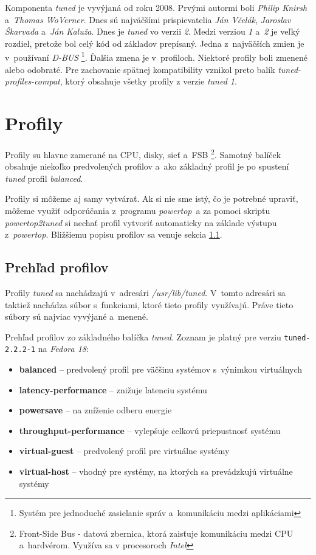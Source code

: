 Komponenta \emph{tuned} je vyvýjaná od roku 2008. Prvými autormi boli
\emph{Philip Knirsh} a~\emph{Thomas WoVerner}. Dnes sú najväčšími
prispievatelia \emph{Ján Včelák}, \emph{Jaroslav Škarvada} a~\emph{Ján Kaluža}.
Dnes je \emph{tuned} vo verzii \emph{2}. Medzi verziou \emph{1} a~\emph{2} je
veľký rozdiel, pretože bol celý kód od základov prepísaný. Jedna z~najväčších
zmien je v~používaní \emph{D-BUS} \footnote{Systém pre jednoduché zasielanie
správ a~komunikáciu medzi aplikáciami}. Ďalšia zmena je v~profiloch. Niektoré
profily boli zmenené alebo odobraté. Pre zachovanie spätnej kompatibility
vznikol preto balík \emph{tuned-profiles-compat}, ktorý obsahuje všetky profily
z verzie \emph{tuned 1}.

%
%

\section{Profily}

Profily su hlavne zamerané na CPU, disky, sieť a~FSB \footnote{Front-Side Bus -
datová zbernica, ktorá zaisťuje komunikáciu medzi CPU a~hardvérom. Využíva sa v
procesoroch \emph{Intel}}. Samotný balíček obsahuje niekoľko predvolených
profilov a~ako základný profil je po spustení \emph{tuned} profil \emph{balanced}.

Profily si môžeme aj samy vytvárať. Ak si nie sme istý, čo je potrebné upraviť,
môžeme využiť odporúčania z~programu \emph{powertop}\cite{powertopHomepage}~a
za pomoci skriptu \emph{powertop2tuned} si nechať profil vytvoriť automaticky
na základe výstupu z~\emph{powertop}. Bližšiemu popisu profilov sa venuje
sekcia \ref{sec:prehladProfilov}. 


%
%

\subsection{Prehľad profilov}
\label{sec:prehladProfilov}

Profily \emph{tuned} sa nachádzajú v~adresári \emph{/usr/lib/tuned}. V~tomto
adresári sa taktiež nachádza súbor s~funkciami, ktoré tieto profily využívajú.
Práve tieto súbory sú najviac vyvýjané a~menené.

Prehľad profilov zo základného balíčka \emph{tuned}. Zoznam je platný pre
verziu \texttt{tuned-2.2.2-1} na \emph{Fedora 18}:

\begin{itemize}
    \item \textbf{balanced} -- predvolený profil pre väčšinu systémov s~výnimkou virtuálnych
    \item \textbf{latency-performance} -- znižuje latenciu systému
    \item \textbf{powersave} -- na zníženie odberu energie
    \item \textbf{throughput-performance} -- vylepšuje celkovú priepustnosť systému 
    \item \textbf{virtual-guest} -- predvolený profil pre virtuálne systémy
    \item \textbf{virtual-host} -- vhodný pre systémy, na ktorých sa prevádzkujú virtuálne systémy
\end{itemize}

